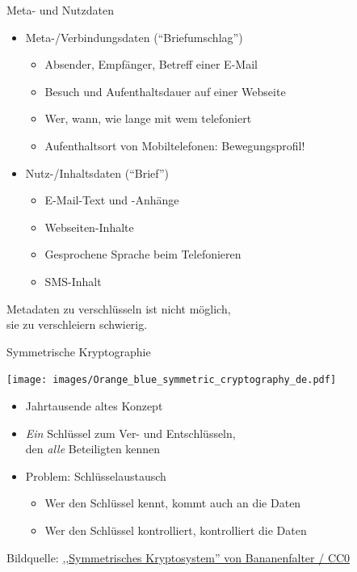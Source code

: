  \begin{frame}{Meta- und Nutzdaten}
    \begin{itemize}
      \item Meta-/Verbindungsdaten (``Briefumschlag'')
      \begin{itemize}
        \item Absender, Empfänger, Betreff einer E-Mail
        \item Besuch und Aufenthaltsdauer auf einer Webseite
        \item Wer, wann, wie lange mit wem telefoniert
        \item Aufenthaltsort von Mobiltelefonen: Bewegungsprofil!
      \end{itemize}
      \item Nutz-/Inhaltsdaten (``Brief'')
      \begin{itemize}
        \item E-Mail-Text und -Anhänge
        \item Webseiten-Inhalte
        \item Gesprochene Sprache beim Telefonieren
        \item SMS-Inhalt
      \end{itemize}
    \end{itemize}

  Metadaten zu verschlüsseln ist nicht möglich,\\ sie zu verschleiern schwierig.
  \end{frame}

  \begin{frame}{Symmetrische Kryptographie}
    \begin{center}
      \texttt{[image: images/Orange\_blue\_symmetric\_cryptography\_de.pdf]}
    \end{center}
    \begin{itemize}
      \item Jahrtausende altes Konzept
      \item \emph{Ein} Schlüssel zum Ver- und Entschlüsseln,\\den \emph{alle} Beteiligten kennen
      \item Problem: Schlüsselaustausch
      \begin{itemize}
        \item Wer den Schlüssel kennt, kommt auch an die Daten
        \item Wer den Schlüssel kontrolliert, kontrolliert die Daten
      \end{itemize}
    \end{itemize}
    \tiny Bildquelle: \href{https://de.wikipedia.org/wiki/Datei:Orange_blue_symmetric_cryptography_de.svg}{,,Symmetrisches Kryptosystem'' von Bananenfalter / CC0}
  \end{frame}
  

